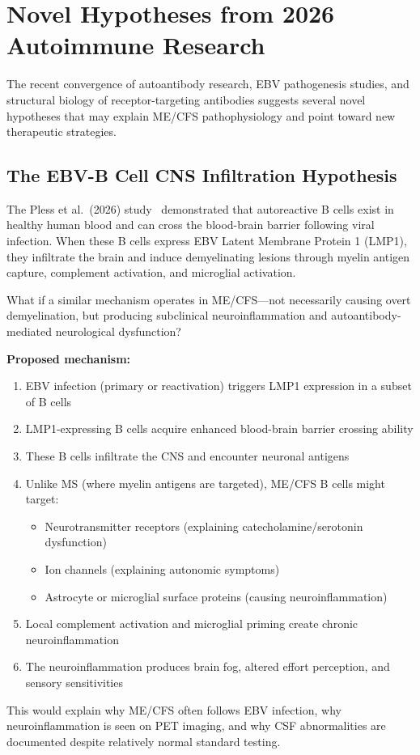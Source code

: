 \section{Novel Hypotheses from 2026 Autoimmune Research}
\label{sec:2026-autoimmune-hypotheses}

The recent convergence of autoantibody research, EBV pathogenesis studies, and structural biology of receptor-targeting antibodies suggests several novel hypotheses that may explain ME/CFS pathophysiology and point toward new therapeutic strategies.

\subsection{The EBV-B Cell CNS Infiltration Hypothesis}

\begin{open_question}
The Pless et al.\ (2026) study~\cite{Pless2026ebv_demyelination} demonstrated that autoreactive B cells exist in healthy human blood and can cross the blood-brain barrier following viral infection. When these B cells express EBV Latent Membrane Protein 1 (LMP1), they infiltrate the brain and induce demyelinating lesions through myelin antigen capture, complement activation, and microglial activation.

What if a similar mechanism operates in ME/CFS---not necessarily causing overt demyelination, but producing subclinical neuroinflammation and autoantibody-mediated neurological dysfunction?

\textbf{Proposed mechanism:}
\begin{enumerate}
    \item EBV infection (primary or reactivation) triggers LMP1 expression in a subset of B cells
    \item LMP1-expressing B cells acquire enhanced blood-brain barrier crossing ability
    \item These B cells infiltrate the CNS and encounter neuronal antigens
    \item Unlike MS (where myelin antigens are targeted), ME/CFS B cells might target:
    \begin{itemize}
        \item Neurotransmitter receptors (explaining catecholamine/serotonin dysfunction)
        \item Ion channels (explaining autonomic symptoms)
        \item Astrocyte or microglial surface proteins (causing neuroinflammation)
    \end{itemize}
    \item Local complement activation and microglial priming create chronic neuroinflammation
    \item The neuroinflammation produces brain fog, altered effort perception, and sensory sensitivities
\end{enumerate}

This would explain why ME/CFS often follows EBV infection, why neuroinflammation is seen on PET imaging, and why CSF abnormalities are documented despite relatively normal standard testing.
\end{open_question}

